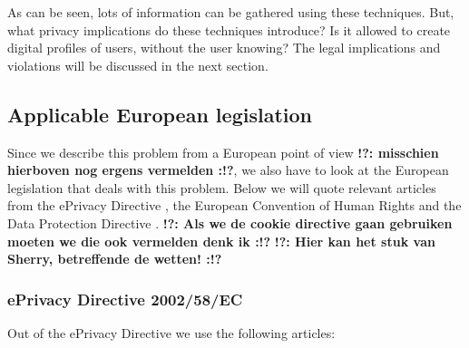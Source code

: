 \documentclass[11pt]{article}
\newcommand{\tocheck}[1]{{\bf !?: #1 :!?}}
\newcommand{\ePD}{ePrivacy Directive }
\newcommand{\DPD}{Data Protection Directive }
\begin{document}
As can be seen, lots of information can be gathered using these techniques. But, what privacy implications do these techniques introduce? Is it allowed to create digital profiles of users, without the user knowing? The legal implications and violations will be discussed in the next section.


\subsection{Applicable European legislation}
Since we describe this problem from a European point of view \tocheck{misschien hierboven nog ergens vermelden}, we also have to look at the European legislation that deals with this problem. Below we will quote relevant articles from the \ePD, the European Convention of Human Rights and the \DPD. \tocheck{Als we de cookie directive gaan gebruiken moeten we die ook vermelden denk ik}
\tocheck{Hier kan het stuk van Sherry, betreffende de wetten!}


\subsubsection{\ePD 2002/58/EC}

Out of the \ePD we use the following articles:
\end{document}
